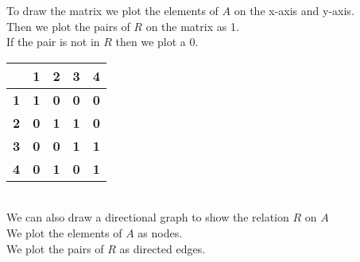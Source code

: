 To draw the matrix we plot the elements of $A$ on the x-axis and y-axis. \\
Then we plot the pairs of $R$ on the matrix as 1. \\
If the pair is not in $R$ then we plot a 0. \\

 
\begin{tabular}{|c|c|c|c|c|}
\hline
\multicolumn{1}{|c|}{\textbf{}} & \multicolumn{1}{c|}{\textbf{1}} & \multicolumn{1}{c|}{\textbf{2}} & \multicolumn{1}{c|}{\textbf{3}} & \multicolumn{1}{c|}{\textbf{4}} \\ \hline
\multicolumn{1}{|c|}{\textbf{1}} & \multicolumn{1}{c|}{\textbf{1}} & \multicolumn{1}{c|}{\textbf{0}} & \multicolumn{1}{c|}{\textbf{0}} & \multicolumn{1}{c|}{\textbf{0}} \\ \hline
\multicolumn{1}{|c|}{\textbf{2}} & \multicolumn{1}{c|}{\textbf{0}} & \multicolumn{1}{c|}{\textbf{1}} & \multicolumn{1}{c|}{\textbf{1}} & \multicolumn{1}{c|}{\textbf{0}} \\ \hline
\multicolumn{1}{|c|}{\textbf{3}} & \multicolumn{1}{c|}{\textbf{0}} & \multicolumn{1}{c|}{\textbf{0}} & \multicolumn{1}{c|}{\textbf{1}} & \multicolumn{1}{c|}{\textbf{1}} \\ \hline
\multicolumn{1}{|c|}{\textbf{4}} & \multicolumn{1}{c|}{\textbf{0}} & \multicolumn{1}{c|}{\textbf{1}} & \multicolumn{1}{c|}{\textbf{0}} & \multicolumn{1}{c|}{\textbf{1}} \\ \hline
\end{tabular} \\

We can also draw a directional graph to show the relation $R$ on $A$ \\
We plot the elements of $A$ as nodes. \\
We plot the pairs of $R$ as directed edges. \\

 \\


